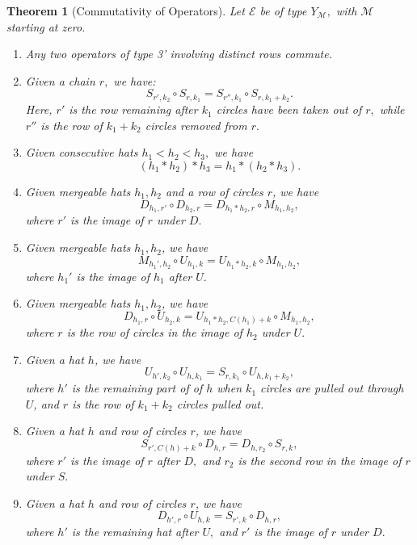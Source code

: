 \documentclass[11pt,letterpaper]{amsart}
\newcommand{\EE}{\mathcal{E}}
\newtheorem{thm}{Theorem}[section]
\numberwithin{equation}{section}
\begin{document}
\begin{thm}[Commutativity of Operators]
\label{Commutativity of Operators} Let $\EE$ be of type $Y_\mathcal{M},$ with $\mathcal{M}$ starting at zero.
    \begin{enumerate}
        \item Any two operators of type 3' involving distinct rows commute.
        
        \item Given a chain $r,$ we have:
        $$S_{r', k_2} \circ S_{r, k_1} = S_{r'', k_1} \circ S_{r, k_1 + k_2}.$$
        Here, $r'$ is the row remaining after $k_1$ circles have been taken out of $r,$ while $r''$ is the row of $k_1 + k_2$ circles removed from $r.$

        
        \item Given consecutive hats $h_1 < h_2 < h_3,$ we have
        $$(h_1 * h_2) * h_3 = h_1 * (h_2 * h_3).$$


        \item Given mergeable hats $h_1, h_2$ and a row of circles $r$, we have
        $$D_{h_1, r'} \circ D_{h_2, r} = D_{h_1 * h_2, r} \circ M_{h_1, h_2},$$
        where $r'$ is the image of $r$ under $D.$

        
        \item Given mergeable hats $h_1, h_2$, we have
        $$M_{h_1', h_2} \circ U_{h_1, k} = U_{h_1 * h_2, k} \circ M_{h_1, h_2},$$
        where $h_1'$ is the image of $h_1$ after $U.$


        \item Given mergeable hats $h_1, h_2$, we have
        $$D_{h_1, r} \circ U_{h_2, k} = U_{h_1 * h_2, C(h_1) + k} \circ M_{h_1, h_2},$$
        where $r$ is the row of circles in the image of $h_2$ under $U.$


        \item Given a hat $h$, we have
        $$U_{h', k_2} \circ U_{h, k_1} = S_{r, k_1} \circ U_{h, k_1 + k_2},$$
        where $h'$ is the remaining part of of $h$ when $k_1$ circles are pulled out through $U$, and $r$ is the row of $k_1 + k_2$ circles pulled out.


        \item Given a hat $h$ and row of circles $r$, we have
        $$S_{r', C(h) + k} \circ D_{h, r} = D_{h, r_2} \circ S_{r, k},$$
        where $r'$ is the image of $r$ after $D,$ and $r_2$ is the second row in the image of $r$ under $S.$

        
        \item Given a hat $h$ and row of circles $r$, we have
        $$D_{h', r} \circ U_{h, k} = S_{r', k} \circ D_{h, r},$$
        where $h'$ is the remaining hat after $U,$ and $r'$ is the image of $r$ under $D.$
    \end{enumerate}
\end{thm}
\end{document}
